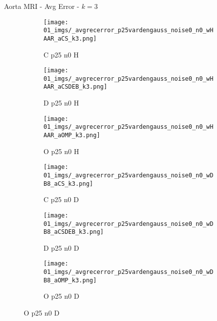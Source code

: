 \begin{frame}{Aorta MRI - Avg Error - $k=3$}{}
\begin{figure}
\begin{subfigure}{0.13\textwidth}
\texttt{[image: 01\_imgs/\_avgrecerror\_p25vardengauss\_noise0\_n0\_wHAAR\_aCS\_k3.png]}
\caption*{\tiny C p25 n0 H}
\end{subfigure}
\begin{subfigure}{0.13\textwidth}
\texttt{[image: 01\_imgs/\_avgrecerror\_p25vardengauss\_noise0\_n0\_wHAAR\_aCSDEB\_k3.png]}
\caption*{\tiny D p25 n0 H}
\end{subfigure}
\begin{subfigure}{0.13\textwidth}
\texttt{[image: 01\_imgs/\_avgrecerror\_p25vardengauss\_noise0\_n0\_wHAAR\_aOMP\_k3.png]}
\caption*{\tiny O p25 n0 H}
\end{subfigure}
\begin{subfigure}{0.13\textwidth}
\texttt{[image: 01\_imgs/\_avgrecerror\_p25vardengauss\_noise0\_n0\_wDB8\_aCS\_k3.png]}
\caption*{\tiny C p25 n0 D}
\end{subfigure}
\begin{subfigure}{0.13\textwidth}
\texttt{[image: 01\_imgs/\_avgrecerror\_p25vardengauss\_noise0\_n0\_wDB8\_aCSDEB\_k3.png]}
\caption*{\tiny D p25 n0 D}
\end{subfigure}
\begin{subfigure}{0.13\textwidth}
\texttt{[image: 01\_imgs/\_avgrecerror\_p25vardengauss\_noise0\_n0\_wDB8\_aOMP\_k3.png]}
\caption*{\tiny O p25 n0 D}
\end{subfigure}

\vspace{5pt}


\end{figure}
\end{frame}
